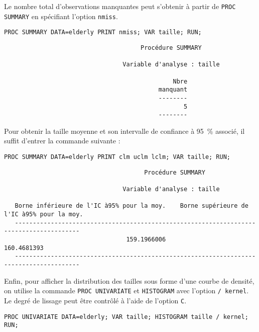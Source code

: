 Le nombre total d'observations manquantes peut s'obtenir à partir de
\texttt{PROC SUMMARY} en spécifiant l'option \texttt{nmiss}.
\begin{verbatim}
PROC SUMMARY DATA=elderly PRINT nmiss; VAR taille; RUN;
\end{verbatim}

\begin{verbatim}
                                      Procédure SUMMARY

                                 Variable d'analyse : taille

                                               Nbre
                                           manquant
                                           --------
                                                  5
                                           --------
\end{verbatim}

Pour obtenir la taille moyenne et son intervalle de confiance à 95~\%
associé, il suffit d'entrer la commande suivante :
\begin{verbatim}
PROC SUMMARY DATA=elderly PRINT clm uclm lclm; VAR taille; RUN;
\end{verbatim}

\begin{verbatim}
                                       Procédure SUMMARY

                                 Variable d'analyse : taille

   Borne inférieure de l'IC à95% pour la moy.    Borne supérieure de l'IC à95% pour la moy.
   ----------------------------------------------------------------------------------------
                                  159.1966006                                   160.4681393
   ----------------------------------------------------------------------------------------
\end{verbatim}

Enfin, pour afficher la distribution des tailles sous forme d'une courbe de
densité, on utilise la commande \texttt{PROC UNIVARIATE} et
\texttt{HISTOGRAM} avec l'option \texttt{/ kernel}. Le degré de lissage peut
être contrôlé à l'aide de l'option \texttt{C}.
\begin{verbatim}
PROC UNIVARIATE DATA=elderly; VAR taille; HISTOGRAM taille / kernel; RUN;
\end{verbatim}

